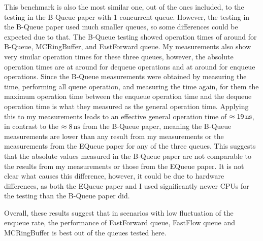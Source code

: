 This benchmark is also the most similar one, out of the ones included, to the testing in the B-Queue paper
with 1 concurrent queue.
However, the testing in the B-Queue paper used much smaller queues, so some differences could be expected due to that.
The B-Queue testing showed operation times of around  for B-Queue, MCRingBuffer, and FastForward queue.
My measurements also show very similar operation times for these three queues, however,
the absolute operation times are at around  for dequeue operations and at around  for enqueue operations.
Since the B-Queue measurements were obtained by measuring the time, performing all queue operation, and
measuring the time again, for them the maximum operation time between the enqueue operation time and the
dequeue operation time is what they measured as the general operation time.
Applying this to my measurements leads to an effective general operation time of $\approx\SI{19}{\nano\second}$, in
contrast to the $\approx\SI{8}{\nano\second}$ from the B-Queue paper, meaning the B-Queue measurements are lower than any
result from my measurements or the measurements from the EQueue paper for any of the three queues\cite{B-Queue,EQueue}.
This suggests that the absolute values measured in the B-Queue paper are not comparable to the results from
my measurements or those from the EQueue paper.
It is not clear what causes this difference, however, it could be due to hardware differences, as both the
EQueue paper and I used significantly newer CPUs for the testing than the B-Queue paper did.

Overall, these results suggest that in scenarios with low fluctuation of the enqueue rate, the performance of
FastForward queue, FastFlow queue and MCRingBuffer is best out of the queues tested here.
